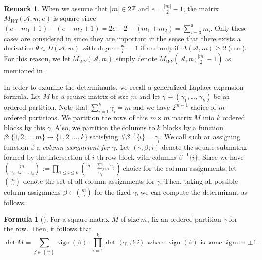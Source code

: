 \documentclass[12pt]{amsart}
\theoremstyle{definition}
\newtheorem{remark}[definition]{Remark}
\newtheorem{formula}[definition]{Formula}
\newcommand{\NN}{\mathbb{N}}
\newcommand{\ZZ}{\mathbb{Z}}
\newcommand{\AAA}{\mathcal{A}}
\newcommand{\sign}{\operatorname{sign}}
\begin{document}
\begin{remark}\label{remark:square case}
    When we assume that $|m|\in2\ZZ$ and $e=\frac{|m|}{2}-1$, 
    the matrix $M_{WY}(\AAA,m;e)$ is square since 
    $(e-m_1+1)+(e-m_2+1)=2e+2-(m_1+m_2)=\sum_{i=3}^{n}m_i$. 
    Only these cases are considered in \cite{Wakefield-Yuzvinsky} 
    since they are important in the sense that 
    there exists a derivation $\theta\in D(\AAA,m)$ with degree $\frac{|m|}{2}-1$ 
    if and only if $\Delta(\AAA,m)\geq2$ (see ). 
    For this reason, 
    we let $M_{WY}(\AAA,m)$ simply denote $M_{WY}(\AAA,m;\frac{|m|}{2}-1)$ 
    as mentioned in . 
\end{remark}

In order to examine the determinants, we recall a generalized Laplace expansion formula. 
Let $M$ be a square matrix of size $m$ and let 
$\gamma=(\gamma_1,\ldots,\gamma_k)$ be an ordered partition. %
Note that $\sum_{i=1}^{k}\gamma_i=m$ 
and we have $2^{m-1}$ choice of $m$-ordered partitions. 
%
We partition the rows of this $m\times m$ matrix $M$ into $k$ ordered blocks by this $\gamma$. 
Also, we partition the columns to $k$ blocks by a function 
$\beta:\{1,2,\ldots,m\}\to\{1,2,\ldots,k\}$ 
satisfying 
$\#\beta^{-1}\{i\}=\gamma_i$. 
We call such an assigning function $\beta$ %
a \emph{column assignment for $\gamma$}. 
%
Let $(\gamma,\beta;i)$ denote 
the square submatrix formed by the intersection of $i$-th row block with columns $\beta^{-1}\{i\}$. 
%
Since we have $\binom{m}{\gamma_1,\gamma_2,\ldots,\gamma_k}:=\prod_{1\leq i \leq k} \binom{m-\sum_{j<i}\gamma_j}{\gamma_i}$ choice 
for the column assignments, let $\binom{m}{\gamma}$ denote the set of all column assignments for $\gamma$. 
% 
Then, taking all possible column assignmens $\beta\in \binom{m}{\gamma}$ for the fixed $\gamma$, we can compute the determinant as follows. 
%

\begin{formula}[\cite{Wakefield-Yuzvinsky}]
\label{formula:Muir}
For a square matrix $M$ of size $m$, 
fix an ordered partition $\gamma$ for the row. 
Then, it follows that 
$$\det M = \sum_{\beta\in\binom{m}{\gamma}} \sign(\beta)\cdot
\prod_{i=1}^{k} \det(\gamma,\beta;i) 
\text{ where $\sign(\beta)$ is some signum $\pm1$. }$$ 
\end{formula}
\end{document}
